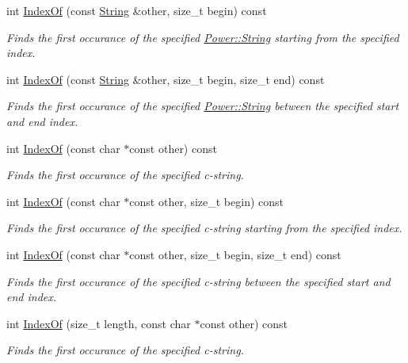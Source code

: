 \begin{DoxyCompactItemize}
int \hyperlink{class_power_1_1_string_aa4e196eae877f4f169269283bf677b9c}{Index\+Of} (const \hyperlink{class_power_1_1_string}{String} \&other, size\+\_\+t begin) const
\begin{DoxyCompactList}\small\item\em Finds the first occurance of the specified \hyperlink{class_power_1_1_string}{Power\+::\+String} starting from the specified index. \end{DoxyCompactList}\item 
int \hyperlink{class_power_1_1_string_a9e204e6e8f98ebbd6db70bfb5312e7ae}{Index\+Of} (const \hyperlink{class_power_1_1_string}{String} \&other, size\+\_\+t begin, size\+\_\+t end) const
\begin{DoxyCompactList}\small\item\em Finds the first occurance of the specified \hyperlink{class_power_1_1_string}{Power\+::\+String} between the specified start and end index. \end{DoxyCompactList}\item 
int \hyperlink{class_power_1_1_string_a431cea53a02daa397a5598138fa0c656}{Index\+Of} (const char $\ast$const other) const
\begin{DoxyCompactList}\small\item\em Finds the first occurance of the specified c-\/string. \end{DoxyCompactList}\item 
int \hyperlink{class_power_1_1_string_a4ddb609f41c44132b4f3214597f32011}{Index\+Of} (const char $\ast$const other, size\+\_\+t begin) const
\begin{DoxyCompactList}\small\item\em Finds the first occurance of the specified c-\/string starting from the specified index. \end{DoxyCompactList}\item 
int \hyperlink{class_power_1_1_string_aba3dd71c9771c992c27c6ee6c81fb802}{Index\+Of} (const char $\ast$const other, size\+\_\+t begin, size\+\_\+t end) const
\begin{DoxyCompactList}\small\item\em Finds the first occurance of the specified c-\/string between the specified start and end index. \end{DoxyCompactList}\item 
int \hyperlink{class_power_1_1_string_a489427963f47ef1ab11dff53218e8fdd}{Index\+Of} (size\+\_\+t length, const char $\ast$const other) const
\begin{DoxyCompactList}\small\item\em Finds the first occurance of the specified c-\/string. \end{DoxyCompactList}\item 

\end{DoxyCompactItemize}
